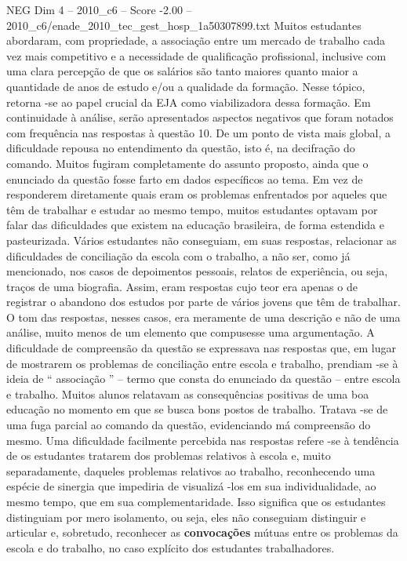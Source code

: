 \begin{textsample}{NEG Dim 4 – 2010\_c6 – Score -2.00 – 2010\_c6/enade\_2010\_tec\_gest\_hosp\_1a50307899.txt}
Muitos estudantes abordaram, com propriedade, a associação entre um mercado de trabalho cada vez mais competitivo e a necessidade de qualificação profissional, inclusive com uma clara percepção de que os salários são tanto maiores quanto maior a quantidade de anos de estudo e/ou a qualidade da formação.
Nesse tópico, retorna -se ao papel crucial da EJA como viabilizadora dessa formação.
Em continuidade à análise, serão apresentados aspectos negativos que foram notados com frequência nas respostas à questão 10.
De um ponto de vista mais global, a dificuldade repousa no entendimento da questão, isto é, na decifração do comando.
Muitos fugiram completamente do assunto proposto, ainda que o enunciado da questão fosse farto em dados específicos ao tema.
Em vez de responderem diretamente quais eram os problemas enfrentados por aqueles que têm de trabalhar e estudar ao mesmo tempo, muitos estudantes optavam por falar das dificuldades que existem na educação brasileira, de forma estendida e pasteurizada.
Vários estudantes não conseguiam, em suas respostas, relacionar as dificuldades de conciliação da escola com o trabalho, a não ser, como já mencionado, nos casos de depoimentos pessoais, relatos de experiência, ou seja, traços de uma biografia.
Assim, eram respostas cujo teor era apenas o de registrar o abandono dos estudos por parte de vários jovens que têm de trabalhar.
O tom das respostas, nesses casos, era meramente de uma descrição e não de uma análise, muito menos de um elemento que compusesse uma argumentação.
A dificuldade de compreensão da questão se expressava nas respostas que, em lugar de mostrarem os problemas de conciliação entre escola e trabalho, prendiam -se à ideia de “ associação ” – termo que consta do enunciado da questão – entre escola e trabalho.
Muitos alunos relatavam as consequências positivas de uma boa educação no momento em que se busca bons postos de trabalho.
Tratava -se de uma fuga parcial ao comando da questão, evidenciando má compreensão do mesmo.
Uma dificuldade facilmente percebida nas respostas refere -se à tendência de os estudantes tratarem dos problemas relativos à escola e, muito separadamente, daqueles problemas relativos ao trabalho, reconhecendo uma espécie de sinergia que impediria de visualizá -los em sua individualidade, ao mesmo tempo, que em sua complementaridade.
Isso significa que os estudantes distinguiam por mero isolamento, ou seja, eles não conseguiam distinguir e articular e, sobretudo, reconhecer as \textbf{convocações} mútuas entre os problemas da escola e do trabalho, no caso explícito dos estudantes trabalhadores.

\end{textsample}
